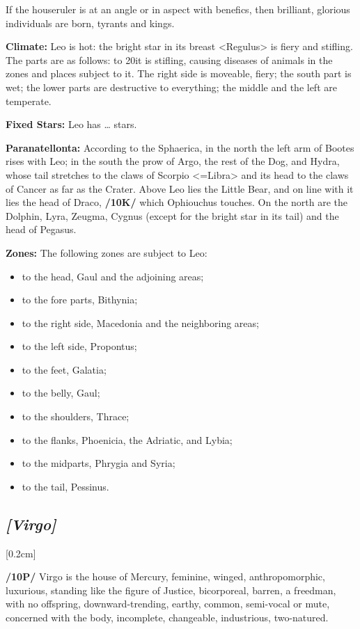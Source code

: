 \mndl[0.2cm]
If the houseruler is at an angle or in aspect with benefics, then brilliant, glorious individuals are born, tyrants and kings.

\textbf{Climate:} Leo is hot: the bright star in its breast <Regulus> is fiery and stifling. The parts are as follows: to 20\deg it is stifling, causing diseases of animals in the zones and places subject to it. The right side is moveable,
fiery; the south part is wet; the lower parts are destructive to everything; the middle and the left are temperate.

\textbf{Fixed Stars:} Leo has … stars. 

\textbf{Paranatellonta:} According to the Sphaerica, in the north the left arm of Bootes rises with Leo; in the south the prow of Argo, the rest of the Dog, and Hydra, whose tail stretches to the claws of Scorpio <=Libra> and its head to the claws of Cancer as far as the Crater. Above Leo lies the Little Bear, and on line with it lies the head of Draco, \textbf{/10K/} which Ophiouchus touches. On the north are the Dolphin, Lyra, Zeugma, Cygnus (except for the bright star in its tail) and the head of Pegasus.

\textbf{Zones: } The following zones are subject to Leo: 
\begin{itemize}
\item to the head, Gaul and the adjoining areas; 
\item to the fore parts, Bithynia; 
\item to the right side, Macedonia and the neighboring areas; \item to the left side, Propontus; 
\item to the feet, Galatia; 
\item to the belly, Gaul; 
\item to the shoulders, Thrace; 
\item to the flanks, Phoenicia, the Adriatic, and Lybia; 
\item to the midparts, Phrygia and Syria; 
\item to the tail, Pessinus.
\end{itemize}

\secbr
\subsection{\textit{[Virgo]}}
[0.2cm]

\textbf{/10P/} Virgo is the house of Mercury, feminine, winged, anthropomorphic, luxurious, standing like the
figure of Justice, bicorporeal, barren, a freedman, with no offspring, downward-trending, earthy, common, semi-vocal or mute, concerned with the body, incomplete, changeable, industrious, two-natured. 

